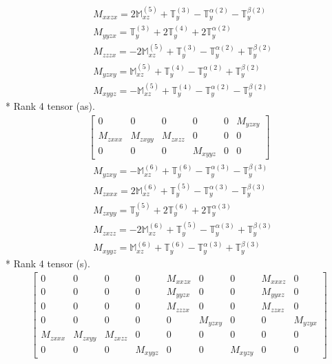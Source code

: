 \documentclass[fleqn,8pt,landscape]{jsarticle}
\begin{document}
\begin{align*}
& M_{xxzx} = 2 \mathbb{M}_{xz}^{(5)} + \mathbb{T}_{y}^{(3)} - \mathbb{T}_{y}^{\alpha(2)} - \mathbb{T}_{y}^{\beta(2)} \\
& M_{yyzx} = \mathbb{T}_{y}^{(3)} + 2 \mathbb{T}_{y}^{(4)} + 2 \mathbb{T}_{y}^{\alpha(2)} \\
& M_{zzzx} = - 2 \mathbb{M}_{xz}^{(5)} + \mathbb{T}_{y}^{(3)} - \mathbb{T}_{y}^{\alpha(2)} + \mathbb{T}_{y}^{\beta(2)} \\
& M_{yzxy} = \mathbb{M}_{xz}^{(5)} + \mathbb{T}_{y}^{(4)} - \mathbb{T}_{y}^{\alpha(2)} + \mathbb{T}_{y}^{\beta(2)} \\
& M_{xyyz} = - \mathbb{M}_{xz}^{(5)} + \mathbb{T}_{y}^{(4)} - \mathbb{T}_{y}^{\alpha(2)} - \mathbb{T}_{y}^{\beta(2)}
\end{align*}
* Rank 4 tensor (as).
\begin{align*}
\begin{bmatrix} 0 & 0 & 0 & 0 & 0 & M_{yzxy} \\ M_{zxxx} & M_{zxyy} & M_{zxzz} & 0 & 0 & 0 \\ 0 & 0 & 0 & M_{xyyz} & 0 & 0 \end{bmatrix}
\end{align*}
\begin{align*}
& M_{yzxy} = - \mathbb{M}_{xz}^{(6)} + \mathbb{T}_{y}^{(6)} - \mathbb{T}_{y}^{\alpha(3)} - \mathbb{T}_{y}^{\beta(3)} \\
& M_{zxxx} = 2 \mathbb{M}_{xz}^{(6)} + \mathbb{T}_{y}^{(5)} - \mathbb{T}_{y}^{\alpha(3)} - \mathbb{T}_{y}^{\beta(3)} \\
& M_{zxyy} = \mathbb{T}_{y}^{(5)} + 2 \mathbb{T}_{y}^{(6)} + 2 \mathbb{T}_{y}^{\alpha(3)} \\
& M_{zxzz} = - 2 \mathbb{M}_{xz}^{(6)} + \mathbb{T}_{y}^{(5)} - \mathbb{T}_{y}^{\alpha(3)} + \mathbb{T}_{y}^{\beta(3)} \\
& M_{xyyz} = \mathbb{M}_{xz}^{(6)} + \mathbb{T}_{y}^{(6)} - \mathbb{T}_{y}^{\alpha(3)} + \mathbb{T}_{y}^{\beta(3)}
\end{align*}
* Rank 4 tensor (s).
\begin{align*}
\begin{bmatrix} 0 & 0 & 0 & 0 & M_{xxzx} & 0 & 0 & M_{xxxz} & 0 \\ 0 & 0 & 0 & 0 & M_{yyzx} & 0 & 0 & M_{yyxz} & 0 \\ 0 & 0 & 0 & 0 & M_{zzzx} & 0 & 0 & M_{zzxz} & 0 \\ 0 & 0 & 0 & 0 & 0 & M_{yzxy} & 0 & 0 & M_{yzyx} \\ M_{zxxx} & M_{zxyy} & M_{zxzz} & 0 & 0 & 0 & 0 & 0 & 0 \\ 0 & 0 & 0 & M_{xyyz} & 0 & 0 & M_{xyzy} & 0 & 0 \end{bmatrix}
\end{align*}
\end{document}
